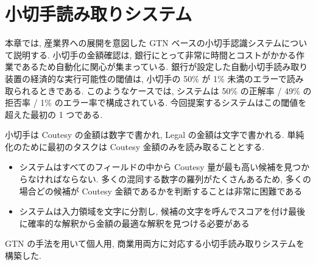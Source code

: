 \documentclass[twocolumn]{jarticle}     %
\begin{document}
\section{小切手読み取りシステム}
本章では, 産業界への展開を意図した GTN ベースの小切手認識システムについて説明する. 
小切手の金額確認は, 銀行にとって非常に時間とコストがかかる作業であるため自動化に関心が集まっている. 銀行が設定した自動小切手読み取り装置の経済的な実行可能性の閾値は, 小切手の 50\% が 1\% 未満のエラーで読み取られるときである. 
このようなケースでは, システムは 50\% の正解率 / 49\% の拒否率 / 1\% のエラー率で構成されている. 
今回提案するシステムはこの閾値を超えた最初の 1 つである.
\par
小切手は Coutesy の金額は数字で書かれ, Legal の金額は文字で書かれる. 単純化のために最初のタスクは Coutesy 金額のみを読み取ることとする. 
\begin{itemize}
  \item システムはすべてのフィールドの中から Coutesy 量が最も高い候補を見つからなければならない. 多くの混同する数字の羅列がたくさんあるため, 多くの場合どの候補が Coutesy 金額であるかを判断することは非常に困難である
  \item システムは入力領域を文字に分割し, 候補の文字を呼んでスコアを付け最後に確率的な解釈から金額の最適な解釈を見つける必要がある
\end{itemize}
GTN の手法を用いて個人用, 商業用両方に対応する小切手読み取りシステムを構築した.
\end{document}
